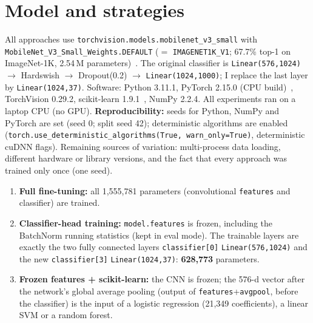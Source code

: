 \documentclass[10pt,a4paper]{article}
\begin{document}
\section{Model and strategies}
All approaches use \texttt{torchvision.models.mobilenet\_v3\_small} with \texttt{MobileNet\_V3\_Small\_Weights.DEFAULT}
($=$ \texttt{IMAGENET1K\_V1}; 67.7\% top-1 on ImageNet-1K, 2.54\,M parameters)~\cite{howard2019}. The original classifier is
\texttt{Linear(576,1024)} $\to$ Hardswish $\to$ Dropout(0.2) $\to$ \texttt{Linear(1024,1000)}; I replace the last layer by \texttt{Linear(1024,37)}.
Software: Python 3.11.1, PyTorch 2.15.0 (CPU build)~\cite{paszke2019}, TorchVision 0.29.2, scikit-learn 1.9.1~\cite{pedregosa2011}, NumPy 2.2.4.
All experiments ran on a laptop CPU (no GPU).
\textbf{Reproducibility:} seeds for Python, NumPy and PyTorch are set (seed 0; split seed 42); deterministic algorithms are enabled
(\texttt{torch.use\_deterministic\_algorithms(True, warn\_only=True)}, deterministic cuDNN flags). Remaining sources of variation:
multi-process data loading, different hardware or library versions, and the fact that every approach was trained only once (one seed).

\begin{enumerate}
\item \textbf{Full fine-tuning:} all 1{,}555{,}781 parameters (convolutional \texttt{features} and classifier) are trained.
\item \textbf{Classifier-head training:} \texttt{model.features} is frozen, including the BatchNorm running statistics (kept in eval mode).
The trainable layers are exactly the two fully connected layers \texttt{classifier[0]} \texttt{Linear(576,1024)} and the new \texttt{classifier[3]} \texttt{Linear(1024,37)}: \textbf{628{,}773} parameters.
\item \textbf{Frozen features + scikit-learn:} the CNN is frozen; the 576-d vector after the network's global average pooling (output of \texttt{features}+\texttt{avgpool}, before the classifier) is the input of
a logistic regression (21{,}349 coefficients), a linear SVM or a random forest.
\end{enumerate}
\end{document}
